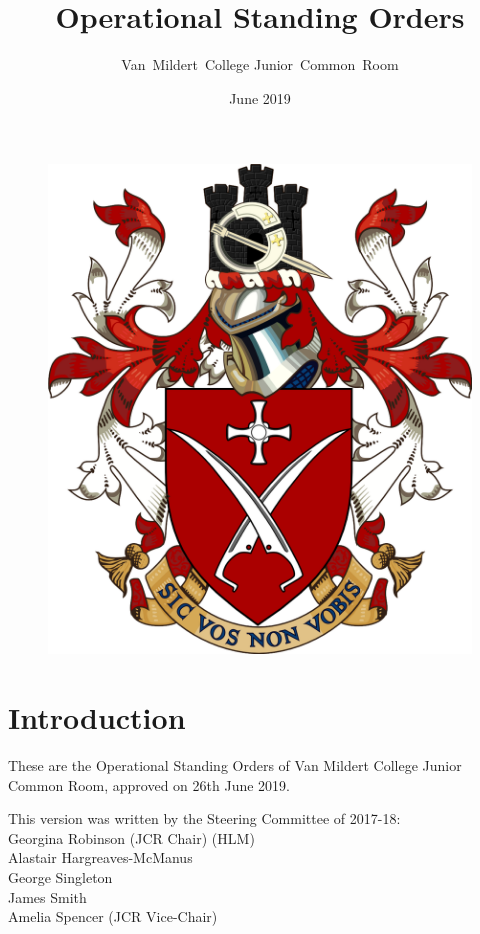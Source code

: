 \documentclass[12pt]{article}  %
\title{Operational Standing Orders}
\author{Van~Mildert~College Junior~Common~Room}
\date{June 2019}
\begin{document}
\begin{titlepage}  %
    \maketitle
    \begin{figure}[h]
    \includegraphics[scale=0.25]{arms}  %
    \centering
    \end{figure}
    \thispagestyle{empty}
\end{titlepage}

\setcounter{page}{2}  %
\section*{Introduction}
These are the Operational Standing Orders of Van Mildert College Junior Common Room, approved on 26th June 2019.

This version was written by the Steering Committee of 2017-18:\\
\hspace*{2cm}Georgina Robinson (JCR Chair) (HLM)\\
\hspace*{2cm}Alastair Hargreaves-McManus\\
\hspace*{2cm}George Singleton\\
\hspace*{2cm}James Smith\\
\hspace*{2cm}Amelia Spencer (JCR Vice-Chair)
\end{document}
